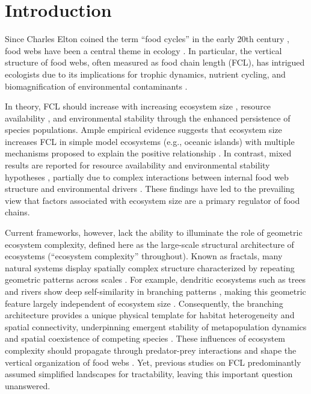 \documentclass[11pt, class=article, crop=false]{standalone}
\theoremstyle{definition}
\begin{document}
\newpage

\section{Introduction}
Since Charles Elton coined the term ``food cycles'' in the early 20th century \citep{elton_animal_1927}, food webs have been a central theme in ecology \citep{paine_food_1966, pimm_food_1991, post_long_2002}.
In particular, the vertical structure of food webs, often measured as food chain length (FCL), has intrigued ecologists due to its implications for trophic dynamics, nutrient cycling, and biomagnification of environmental contaminants \citep{post_long_2002}.

In theory, FCL should increase with increasing ecosystem size \citep{schoener_food_1989}, resource availability \citep{oksanen_exploitation_1981}, and environmental stability \citep{pimm_number_1977} through the enhanced persistence of species populations.
Ample empirical evidence suggests that ecosystem size increases FCL in simple model ecosystems (e.g., oceanic islands) \citep{vander_zanden_patterns_1999, post_ecosystem_2000, takimoto_ecosystem_2008, doi_resource_2009} with multiple mechanisms proposed to explain the positive relationship \citep{takimoto_effects_2012, ward_mechanistic_2017, mcintosh_capacity_2018, terui_spatial_2019}.
In contrast, mixed results are reported for resource availability and environmental stability hypotheses \citep{takimoto_environmental_2013, warfe_productivity_2013, guo_towards_2023}, partially due to complex interactions between internal food web structure and environmental drivers \citep{takimoto_effects_2012, shibasaki_food_2024}.
These findings have led to the prevailing view that factors associated with ecosystem size are a primary regulator of food chains.

Current frameworks, however, lack the ability to illuminate the role of geometric ecosystem complexity, defined here as the large-scale structural architecture of ecosystems (``ecosystem complexity'' throughout).
Known as fractals, many natural systems display spatially complex structure characterized by repeating geometric patterns across scales \citep{turner_landscape_2015, rodriguez-iturbe_fractal_2001}.
For example, dendritic ecosystems such as trees and rivers show deep self-similarity in branching patterns \citep{peckham_reformulation_1999, rodriguez-iturbe_fractal_2001, terui_revisiting_2024}, making this geometric feature largely independent of ecosystem size \citep{terui_revisiting_2024}.
Consequently, the branching architecture provides a unique physical template for habitat heterogeneity and spatial connectivity, underpinning emergent stability of metapopulation dynamics \citep{yeakel_synchronisation_2014, mari_metapopulation_2014, terui_metapopulation_2018} and spatial coexistence of competing species \citep{carrara_dendritic_2012, terui_emergent_2021, rinaldo_river_2018}.
These influences of ecosystem complexity should propagate through predator-prey interactions and shape the vertical organization of food webs \citep{pomeranz_ecosystem_2023, anderson_effects_2018, green_long_2023}.
Yet, previous studies on FCL predominantly assumed simplified landscapes for tractability, leaving this important question unanswered.
\end{document}
